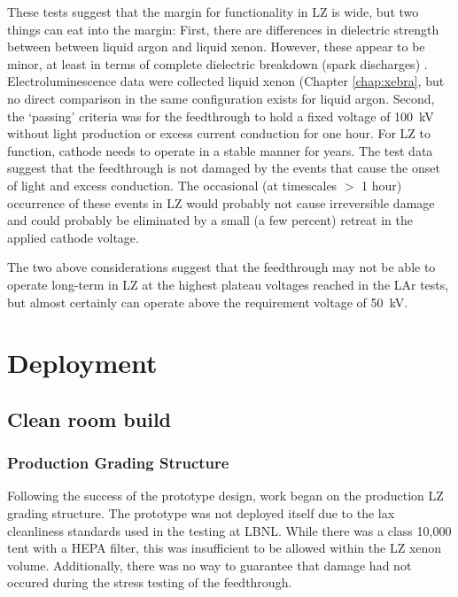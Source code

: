 These tests suggest that the margin for functionality in LZ is wide, but two things can eat into the margin:  First, there are differences in dielectric strength between between liquid argon and liquid xenon.
However, these appear to be minor, at least in terms of complete dielectric breakdown (spark discharges) \cite{tvrznikova_direct_2019}.
Electroluminescence data were collected liquid xenon (Chapter \ref{chap:xebra}, but no direct comparison in the same configuration exists for liquid argon.
Second, the `passing' criteria was for the feedthrough to hold a fixed voltage of 100~kV\cite{mount_lux-zeplin_2017} without light production or excess current conduction for one hour.
For LZ to function, cathode needs to operate in a stable manner for years. 
The test data suggest that the feedthrough is not damaged by the events that cause the onset of light and excess conduction. 
The occasional (at timescales $>$ 1 hour) occurrence of these events in LZ would probably not cause irreversible damage and could probably be eliminated by a small (a few percent) retreat in the applied cathode voltage.

The two above considerations suggest that the feedthrough may not be able to operate long-term in LZ at the highest plateau voltages reached in the LAr tests, but almost certainly can operate above the requirement voltage of 50~kV.

\afterpage{\FloatBarrier}
\section{Deployment}
\subsection{Clean room build}
\subsubsection{Production Grading Structure}
Following the success of the prototype design, work began on the production LZ grading structure.
The prototype was not deployed itself due to the lax cleanliness standards used in the testing at LBNL.
While there was a class 10,000 tent with a HEPA filter, this was insufficient to be allowed within the LZ xenon volume.
Additionally, there was no way to guarantee that damage had not occured during the stress testing of the feedthrough.

